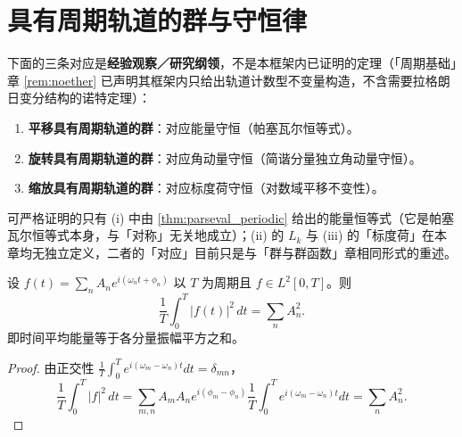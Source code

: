 \section{具有周期轨道的群与守恒律}

\begin{remark}\label{thm:noether_group_with_periodic_orbits}
下面的三条对应是\textbf{经验观察／研究纲领}，不是本框架内已证明的定理（「周期基础」章 \cref{rem:noether} 已声明其框架内只给出轨道计数型不变量构造，不含需要拉格朗日变分结构的诺特定理）：
\begin{enumerate}[label=(\roman*)]
    \item \textbf{平移具有周期轨道的群}：对应能量守恒（帕塞瓦尔恒等式）。
    \item \textbf{旋转具有周期轨道的群}：对应角动量守恒（简谐分量独立角动量守恒）。
    \item \textbf{缩放具有周期轨道的群}：对应标度荷守恒（对数域平移不变性）。
\end{enumerate}
可严格证明的只有 (i) 中由 \cref{thm:parseval_periodic} 给出的能量恒等式（它是帕塞瓦尔恒等式本身，与「对称」无关地成立）；(ii) 的 $L_k$ 与 (iii) 的「标度荷」在本章均无独立定义，二者的「对应」目前只是与「群与群函数」章相同形式的重述。
\end{remark}

\begin{theorem}[帕塞瓦尔恒等式]\label{thm:parseval_periodic}
设 $f(t)=\sum_{n}A_ne^{i(\omega_nt+\phi_n)}$ 以 $T$ 为周期且 $f\in L^2[0,T]$。则
\[
\frac{1}{T}\int_0^T |f(t)|^2\,dt = \sum_n A_n^2.
\]
即时间平均能量等于各分量振幅平方之和。
\end{theorem}

\begin{proof}
由正交性 $\frac{1}{T}\int_0^T e^{i(\omega_m-\omega_n)t}dt=\delta_{mn}$，
\[
\frac{1}{T}\int_0^T |f|^2\,dt = \sum_{m,n}A_mA_ne^{i(\phi_m-\phi_n)}\frac{1}{T}\int_0^T e^{i(\omega_m-\omega_n)t}dt = \sum_n A_n^2.
\]
\end{proof}

